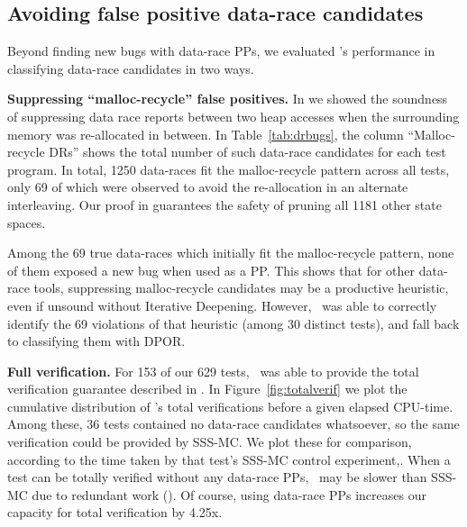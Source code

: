 %


\subsection{Avoiding false positive data-race candidates}
\label{sec:eval-falsepos}

Beyond finding new bugs with data-race PPs, we evaluated \quicksand's performance in classifying data-race candidates in two ways.

{\bf Suppressing ``malloc-recycle'' false positives.}
In \sect{\ref{sec:recycle}} we showed the soundness of suppressing data race reports between two heap accesses when the surrounding memory was re-allocated in between.
In Table~\ref{tab:drbugs}, the column ``Malloc-recycle DRs'' shows the total number of such data-race candidates for each test program.
In total, 1250 data-races fit the malloc-recycle pattern across all tests,
only 69 of which were observed to avoid the re-allocation in an alternate interleaving.
Our proof in \sect{\ref{sec:recycle}} guarantees the safety of pruning all 1181 other state spaces.

Among the 69 true data-races which initially fit the malloc-recycle pattern,
none of them exposed a new bug when used as a PP.
This shows that for other data-race tools,
suppressing malloc-recycle candidates may be a productive heuristic,
even if unsound without Iterative Deepening.
However, \quicksand~was able to correctly identify the 69 violations of that heuristic (among 30 distinct tests),
and fall back to classifying them with DPOR.

{\bf Full verification.}
For 153 of our 629 tests, \quicksand~was able to provide the total verification guarantee described in \sect{\ref{sec:totalverif}}.
In Figure~\ref{fig:totalverif} we plot the cumulative distribution of \quicksand's total verifications before a given elapsed CPU-time.
Among these, 36 tests contained no data-race candidates whatsoever, 
so the same verification could be provided by SSS-MC.
We plot these for comparison,
according to the time taken by that test's SSS-MC control experiment,.
When a test can be totally verified without any data-race PPs,
\quicksand~may be slower than SSS-MC due to redundant work (\sect{\ref{sec:future}}).
Of course, using data-race PPs increases our capacity for total verification by 4.25x.


